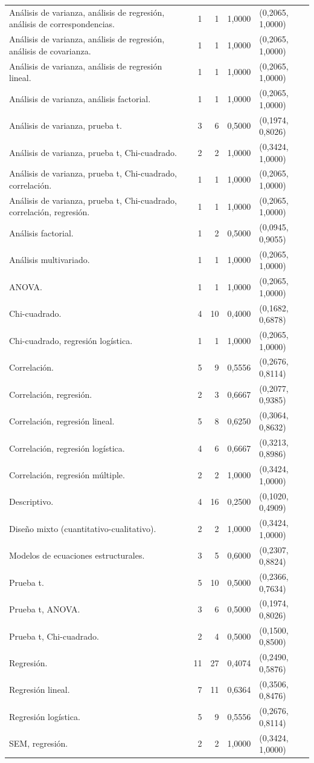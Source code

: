 \begin{longtable}{P{0,56\linewidth}rrP{0,10\linewidth}P{0,24\linewidth}}
Análisis de varianza, análisis de regresión, análisis de correspondencias. & 1 & 1 & 1,0000 & (0,2065, 1,0000)\\
Análisis de varianza, análisis de regresión, análisis de covarianza. & 1 & 1 & 1,0000 & (0,2065, 1,0000)\\
Análisis de varianza, análisis de regresión lineal. & 1 & 1 & 1,0000 & (0,2065, 1,0000)\\
Análisis de varianza, análisis factorial. & 1 & 1 & 1,0000 & (0,2065, 1,0000)\\
Análisis de varianza, prueba t. & 3 & 6 & 0,5000 & (0,1974, 0,8026)\\
Análisis de varianza, prueba t, Chi-cuadrado. & 2 & 2 & 1,0000 & (0,3424, 1,0000)\\
Análisis de varianza, prueba t, Chi-cuadrado, correlación. & 1 & 1 & 1,0000 & (0,2065, 1,0000)\\
Análisis de varianza, prueba t, Chi-cuadrado, correlación, regresión. & 1 & 1 & 1,0000 & (0,2065, 1,0000)\\
Análisis factorial. & 1 & 2 & 0,5000 & (0,0945, 0,9055)\\
Análisis multivariado. & 1 & 1 & 1,0000 & (0,2065, 1,0000)\\
ANOVA. & 1 & 1 & 1,0000 & (0,2065, 1,0000)\\
Chi-cuadrado. & 4 & 10 & 0,4000 & (0,1682, 0,6878)\\
Chi-cuadrado, regresión logística. & 1 & 1 & 1,0000 & (0,2065, 1,0000)\\
Correlación. & 5 & 9 & 0,5556 & (0,2676, 0,8114)\\
Correlación, regresión. & 2 & 3 & 0,6667 & (0,2077, 0,9385)\\
Correlación, regresión lineal. & 5 & 8 & 0,6250 & (0,3064, 0,8632)\\
Correlación, regresión logística. & 4 & 6 & 0,6667 & (0,3213, 0,8986)\\
Correlación, regresión múltiple. & 2 & 2 & 1,0000 & (0,3424, 1,0000)\\
Descriptivo. & 4 & 16 & 0,2500 & (0,1020, 0,4909)\\
Diseño mixto (cuantitativo-cualitativo). & 2 & 2 & 1,0000 & (0,3424, 1,0000)\\
Modelos de ecuaciones estructurales. & 3 & 5 & 0,6000 & (0,2307, 0,8824)\\
Prueba t. & 5 & 10 & 0,5000 & (0,2366, 0,7634)\\
Prueba t, ANOVA. & 3 & 6 & 0,5000 & (0,1974, 0,8026)\\
Prueba t, Chi-cuadrado. & 2 & 4 & 0,5000 & (0,1500, 0,8500)\\
Regresión. & 11 & 27 & 0,4074 & (0,2490, 0,5876)\\
Regresión lineal. & 7 & 11 & 0,6364 & (0,3506, 0,8476)\\
Regresión logística. & 5 & 9 & 0,5556 & (0,2676, 0,8114)\\
SEM, regresión. & 2 & 2 & 1,0000 & (0,3424, 1,0000)\\
\bottomrule
\end{longtable}
\endgroup
